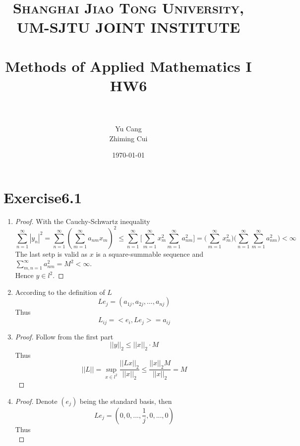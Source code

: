 \documentclass[paper=a4, fontsize=11pt]{scrartcl} %
\title{	
\normalfont \normalsize 
\textsc{Shanghai Jiao Tong University, UM-SJTU JOINT INSTITUTE} \\ [25pt] %
\horrule{0.5pt} \\[0.4cm] %
\huge Methods of Applied Mathematics I\\ HW6 \\ %
\horrule{2pt} \\[0.5cm] %
}
\author{Yu Cang \quad 018370210001\\ Zhiming Cui \quad 017370910006} %
\date{\normalsize \today} %
\numberwithin{equation}{section} %
\numberwithin{figure}{section} %
\numberwithin{table}{section} %
\begin{document}
\maketitle %

\section{Exercise6.1}
	\begin{enumerate}
		\item
			\begin{proof}
				With the Cauchy-Schwartz inequality
				\begin{equation}
					\sum_{n=1}^{\infty} |y_n|^2 = \sum_{n=1}^{\infty} (\sum_{m=1}^{\infty} a_{nm}x_m)^2 \leq \sum_{n=1}^{\infty} \Big[\sum_{m=1}^{\infty}x_m^2 \sum_{m=1}^{\infty} a_{nm}^2\Big] = \Big(\sum_{m=1}^{\infty}x_m^2\Big) \Big(\sum_{n=1}^{\infty} \sum_{m=1}^{\infty} a_{nm}^2\Big) < \infty
				\end{equation}
				The last setp is valid as $x$ is a square-summable sequence and $\sum_{m,n=1}^{\infty} a_{nm}^2 = M^2 < \infty$.\\
				Hence $y\in l^2$.
			\end{proof}
		\item 
			According to the definition of $L$
			\begin{equation}
				L e_j = (a_{1j}, a_{2j}, ... , a_{nj})
			\end{equation}
			Thus
			\begin{equation}
				L_{ij} = <e_i, L e_j> = a_{ij}
			\end{equation}
		\item 
			\begin{proof}
				Follow from the first part
				\begin{equation}
					||y||_2 \leq ||x||_2 \cdot M
				\end{equation}
				Thus
				\begin{equation}
					||L|| = \sup_{x \in l^2} \frac{||Lx||_2}{||x||_2} \leq \frac{||x||_2 M}{||x||_2} = M
				\end{equation}
			\end{proof}
		\item 
			\begin{proof}
				Denote $(e_j)$ being the standard basis, then
				\begin{equation}
					L e_j = (0, 0, ..., \frac{1}{j}, 0, ... , 0)
				\end{equation}
				Thus
				\begin{equation}

\end{equation}
\end{proof}
\end{enumerate}
\end{document}
